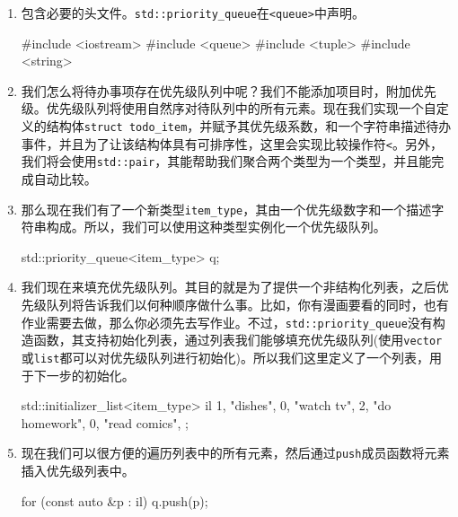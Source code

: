 \begin{enumerate}
\item 包含必要的头文件。\texttt{std::priority\_queue}在\texttt{<queue>}中声明。

\begin{codebox}[cpp]
#include <iostream>
#include <queue>
#include <tuple>
#include <string>
\end{codebox}

\item 我们怎么将待办事项存在优先级队列中呢？我们不能添加项目时，附加优先级。优先级队列将使用自然序对待队列中的所有元素。现在我们实现一个自定义的结构体\texttt{struct todo\_item}，并赋予其优先级系数，和一个字符串描述待办事件，并且为了让该结构体具有可排序性，这里会实现比较操作符\texttt{<}。另外，我们将会使用\texttt{std::pair}，其能帮助我们聚合两个类型为一个类型，并且能完成自动比较。

\begin{codebox}[cpp]
int main()
{
    using item_type = std::pair<int, std::string>;
\end{codebox}

\item 那么现在我们有了一个新类型\texttt{item\_type}，其由一个优先级数字和一个描述字符串构成。所以，我们可以使用这种类型实例化一个优先级队列。

\begin{codebox}[cpp]
    std::priority_queue<item_type> q;
\end{codebox}

\item 我们现在来填充优先级队列。其目的就是为了提供一个非结构化列表，之后优先级队列将告诉我们以何种顺序做什么事。比如，你有漫画要看的同时，也有作业需要去做，那么你必须先去写作业。不过，\texttt{std::priority\_queue}没有构造函数，其支持初始化列表，通过列表我们能够填充优先级队列(使用\texttt{vector}或\texttt{list}都可以对优先级队列进行初始化)。所以我们这里定义了一个列表，用于下一步的初始化。

\begin{codebox}[cpp]
std::initializer_list<item_type> il {
    {1, "dishes"},
    {0, "watch tv"},
    {2, "do homework"},
    {0, "read comics"},
};
\end{codebox}

\item 现在我们可以很方便的遍历列表中的所有元素，然后通过\texttt{push}成员函数将元素插入优先级列表中。

\begin{codebox}[cpp]
for (const auto &p : il) {
    q.push(p);
}
\end{codebox}


\end{enumerate}
